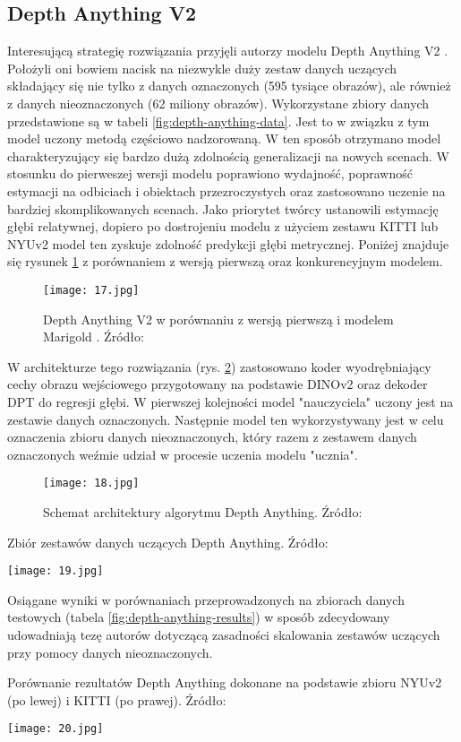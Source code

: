 \subsection{Depth Anything V2}
Interesującą strategię rozwiązania przyjęli autorzy modelu Depth Anything V2 \cite{yang2024depth}. Położyli oni bowiem nacisk na niezwykle duży zestaw danych uczących składający się nie tylko z danych oznaczonych (595 tysiące obrazów), ale również z danych nieoznaczonych (62 miliony obrazów). Wykorzystane zbiory danych przedstawione są w tabeli \ref{fig:depth-anything-data}. Jest to w związku z tym model uczony metodą częściowo nadzorowaną. W ten sposób otrzymano model charakteryzujący się bardzo dużą zdolnością generalizacji na nowych scenach. W stosunku do pierweszej wersji modelu \cite{yang2024depthv1} poprawiono wydajność, poprawność estymacji na odbiciach i obiektach przezroczystych oraz zastosowano uczenie na bardziej skomplikowanych scenach. Jako priorytet twórcy ustanowili estymację głębi relatywnej, dopiero po dostrojeniu modelu z użyciem zestawu KITTI lub NYUv2 model ten zyskuje zdolność predykcji głębi metrycznej. Poniżej znajduje się rysunek \ref{fig:depth-anything} z porównaniem z wersją pierwszą oraz konkurencyjnym modelem.
\begin{figure}[H]
    \centering
    \texttt{[image: 17.jpg]}
    \caption{Depth Anything V2 w porównaniu z wersją pierwszą i modelem Marigold \cite{ke2024repurposing}. Źródło: \cite{yang2024depth}}
    \label{fig:depth-anything}
\end{figure}
W architekturze tego rozwiązania (rys. \ref{fig:depth-anything-schema}) zastosowano koder wyodrębniający cechy obrazu wejściowego przygotowany na podstawie DINOv2 \cite{oquab2024} oraz dekoder DPT do regresji głębi. W pierwszej kolejności model "nauczyciela" uczony jest na zestawie danych oznaczonych. Następnie model ten wykorzystywany jest w celu oznaczenia zbioru danych nieoznaczonych, który razem z zestawem danych oznaczonych weźmie udział w procesie uczenia modelu "ucznia".
\begin{figure}[H]
    \centering
    \texttt{[image: 18.jpg]}
    \caption{Schemat architektury algorytmu Depth Anything. Źródło: \cite{yang2024depth}}
    \label{fig:depth-anything-schema}
\end{figure}
\begin{table}[H]
    \centering
    \caption{Zbiór zestawów danych uczących Depth Anything. Źródło: \cite{yang2024depth}}
    \texttt{[image: 19.jpg]}
    \label{fig:depth-anything-data}
\end{table}
Osiągane wyniki w porównaniach przeprowadzonych na zbiorach danych testowych (tabela \ref{fig:depth-anything-results}) w sposób zdecydowany udowadniają tezę autorów dotyczącą zasadności skalowania zestawów uczących przy pomocy danych nieoznaczonych.
\begin{table}[H]
    \centering
    \caption{Porównanie rezultatów Depth Anything dokonane na podstawie zbioru NYUv2 (po lewej) i KITTI (po prawej). Źródło: \cite{yang2024depth}}
    \texttt{[image: 20.jpg]}
    \label{fig:depth-anything-results}
\end{table}

